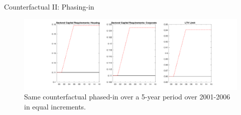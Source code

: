 \documentclass[8pt,aspectratio=169]{beamer}
\numberwithin{equation}{section}
\begin{document}
\begin{frame}{Counterfactual II: Phasing-in}



\begin{figure}[H]
\centering
\caption{Same counterfactual phased-in over a 5-year period over 2001-2006 in equal increments.}
\includegraphics[scale=0.35]{CF_policy_rules10.pdf}

\end{figure}


\end{frame}
\end{document}
